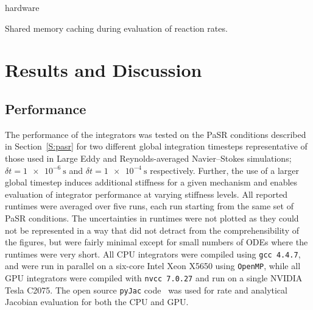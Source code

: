 \documentclass[preprint]{elsarticle}
\makeatletter
\let\OldStatex\Statex
\renewcommand{\Statex}[1][3]{%
  \setlength\@tempdima{\algorithmicindent}%
  \OldStatex\hskip\dimexpr#1\@tempdima\relax}
\makeatother
\begin{document}
\begin{algorithm}[h]hardware
\caption{Shared memory caching during evaluation of reaction rates.}
\label{A:shared_mem_caching}
\end{algorithm}

\section{Results and Discussion}

\subsection{Performance}

The performance of the integrators was tested on the PaSR conditions described in Section~\ref{S:pasr} for two different global integration timesteps representative of those used in Large Eddy and Reynolds-averaged Navier--Stokes simulations; $\delta t = \SI{1e-6}{\s}$ and $\delta t = \SI{1e-4}{\s}$ respectively.
Further, the use of a larger global timestep induces additional stiffness for a given mechanism and enables evaluation of integrator performance at varying stiffness levels.
All reported runtimes were averaged over five runs, each run starting from the same set of PaSR conditions.
The uncertainties in runtimes were not plotted as they could not be represented in a way that did not detract from the comprehensibility of the figures, but were fairly minimal except for small numbers of ODEs where the runtimes were very short.
All CPU integrators were compiled using \texttt{gcc 4.4.7}, and were run in parallel on a six-core Intel Xeon X5650 using \texttt{OpenMP}, while all GPU integrators were compiled with \texttt{nvcc 7.0.27} and run on a single NVIDIA Tesla C2075.
The open source \texttt{pyJac} code~\cite{Niemeyer:2015im,Niemeyer:2015ws} was used for rate and analytical Jacobian evaluation for both the CPU and GPU.
\end{document}
